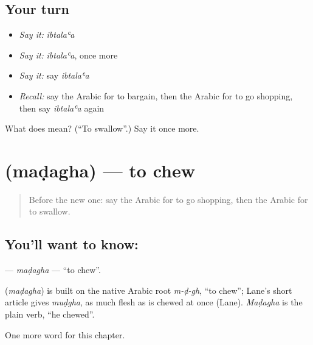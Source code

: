 \subsection*{Your turn}
\begin{itemize}
\raggedright
  \item \emph{Say it:} \emph{ibtalaʿa}
  \item \emph{Say it:} \emph{ibtalaʿa}, once more
  \item \emph{Say it:} say \emph{ibtalaʿa}
  \item \emph{Recall:} say the Arabic for to bargain, then the Arabic for to go shopping, then say \emph{ibtalaʿa} again
\end{itemize}

\begin{tcolorbox}[breakable,colback=teal!4,colframe=teal!35!black,title={Before you move on}]
What does  mean? (\textquotedblleft{}To swallow\textquotedblright{}.) Say it once more.
\end{tcolorbox}
\section[\texorpdfstring{\ar{مضغ} (maḍagha)}{مضغ (maḍagha)}]{ (maḍagha) — to chew}

\label{lesson:AR-C194-madagha}



\begin{quote}
Before the new one: say the Arabic for to go shopping, then the Arabic for to swallow.
\end{quote}

\subsection*{You'll want to know: }
\textbf{} — \emph{maḍagha} — \textquotedblleft{}to chew\textquotedblright{}.

\begin{cousinweb}
\textbf{} (\emph{maḍagha}) is built on the native Arabic root \emph{m-ḍ-gh}, \textquotedblleft{}to chew\textquotedblright{}; Lane's short article gives \emph{muḍgha}, as much flesh as is chewed at once (Lane). \emph{Maḍagha} is the plain verb, \textquotedblleft{}he chewed\textquotedblright{}.
\end{cousinweb}

\begin{grammarlens}[title={What you've built}]
One more word for this chapter.
\end{grammarlens}

